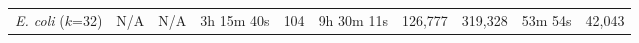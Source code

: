 \begin{mytable}
\begin{tabular}{@{}crrrrrrrrr@{}}


    
    \emph{E. coli} ($k$=32)         & N/A & N/A & 3h 15m 40s & 104 & 9h 30m 11s & 126,777 & 319,328 &  53m 54s & 42,043 \\




\end{tabular}
\end{mytable}
